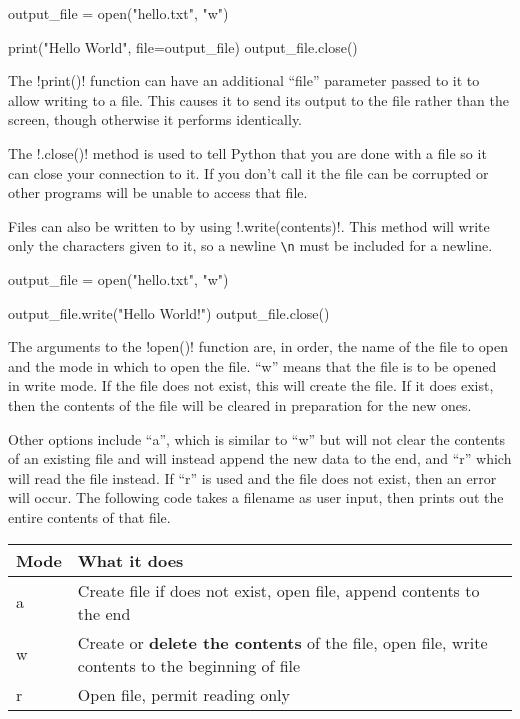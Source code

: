 \documentclass[11pt]{cselabheader}
\begin{document}
\begin{python3code}
output_file = open("hello.txt", "w")

print("Hello World", file=output_file)
output_file.close()
\end{python3code}

The \pythoninline!print()! function can have an additional ``file'' parameter
passed to it to allow writing to a file. This causes it to send its output to
the file rather than the screen, though otherwise it performs identically.

The \pythoninline!.close()! method is used to tell Python that you are done
with a file so it can close your connection to it. If you don't call it
the file can be corrupted or other programs will be unable to access that
file.

Files can also be written to by using \pythoninline!.write(contents)!. This
method will write only the characters given to it, so a newline \lstinline{\n}
must be included for a newline.

\begin{python3code}
output_file = open("hello.txt", "w")

output_file.write("Hello World\nGoodbye!\n")
output_file.close()
\end{python3code}

The arguments to the \pythoninline!open()! function are, in order, the name of
the file to open and the mode in which to open the file. ``w'' means that the
file is to be opened in write mode. If the file does not exist, this will create
the file. If it does exist, then the contents of the file will be cleared in
preparation for the new ones.

Other options include ``a'', which is similar to ``w'' but will not clear the
contents of an existing file and will instead append the new data to the end,
and ``r'' which will read the file instead. If ``r'' is used and the file does
not exist, then an error will occur. The following code takes a filename as user
input, then prints out the entire contents of that file.

\begin{center}
  \begin{tabular}{ll}
    Mode & What it does \\
    \midrule
    a & Create file if does not exist, open file, append contents to the end \\
    w & Create or \textbf{delete the contents} of the file, open file, write contents to the beginning of 
    file \\
    r & Open file, permit reading only \\
  \end{tabular}
\end{center}
\end{document}
